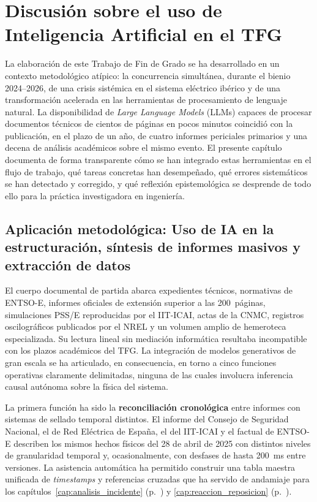 
\chapter{Discusión sobre el uso de Inteligencia Artificial en el TFG}
\label{cap:uso_ia}

La elaboración de este Trabajo de Fin de Grado se ha desarrollado en un contexto
metodológico atípico: la concurrencia simultánea, durante el bienio 2024--2026,
de una crisis sistémica en el sistema eléctrico ibérico y de una transformación
acelerada en las herramientas de procesamiento de lenguaje natural. La
disponibilidad de \textit{Large Language Models} (LLMs) capaces de procesar
documentos técnicos de cientos de páginas en pocos minutos coincidió con la
publicación, en el plazo de un año, de cuatro informes periciales primarios y
una decena de análisis académicos sobre el mismo evento. El presente capítulo
documenta de forma transparente cómo se han integrado estas herramientas en el
flujo de trabajo, qué tareas concretas han desempeñado, qué errores
sistemáticos se han detectado y corregido, y qué reflexión epistemológica se
desprende de todo ello para la práctica investigadora en ingeniería.

\section{Aplicación metodológica: Uso de IA en la estructuración, síntesis de
informes masivos y extracción de datos}
\label{sec:aplicacion_ia}

El cuerpo documental de partida abarca expedientes técnicos, normativas de
ENTSO-E, informes oficiales de extensión superior a las 200~páginas,
simulaciones PSS/E reproducidas por el IIT-ICAI, actas de la CNMC, registros
oscilográficos publicados por el NREL y un volumen amplio de hemeroteca
especializada. Su lectura lineal sin mediación informática resultaba
incompatible con los plazos académicos del TFG. La integración de modelos
generativos de gran escala se ha articulado, en consecuencia, en torno a cinco
funciones operativas claramente delimitadas, ninguna de las cuales involucra
inferencia causal autónoma sobre la física del sistema.

La primera función ha sido la \textbf{reconciliación cronológica} entre
informes con sistemas de sellado temporal distintos. El informe del Consejo de
Seguridad Nacional, el de Red Eléctrica de España, el del IIT-ICAI y el factual
de ENTSO-E describen los mismos hechos físicos del 28 de abril de 2025 con
distintos niveles de granularidad temporal y, ocasionalmente, con desfases de
hasta 200~ms entre versiones. La asistencia automática ha permitido construir
una tabla maestra unificada de \textit{timestamps} y referencias cruzadas que
ha servido de andamiaje para los capítulos~\ref{cap:analisis_incidente}
(p.~\pageref{cap:analisis_incidente}) y \ref{cap:reaccion_reposicion}
(p.~\pageref{cap:reaccion_reposicion}).

